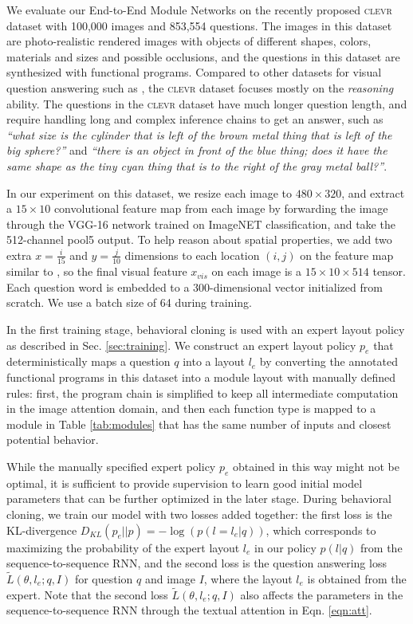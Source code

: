 \documentclass[10pt,twocolumn,letterpaper]{article}
\newcommand{\clevr}{\textsc{clevr}\xspace}
\begin{document}
We evaluate our End-to-End Module Networks on the recently proposed \clevr dataset \cite{johnson2017clevr} with 100,000 images and 853,554 questions. The images in this dataset are photo-realistic rendered images with objects of different shapes, colors, materials and sizes and possible occlusions, and the questions in this dataset are synthesized with functional programs. Compared to other datasets for visual question answering such as \cite{antol15iccv}, the \textsc{clevr} dataset focuses mostly on the \textit{reasoning} ability. The questions in the \clevr dataset have much longer question length, and require handling long and complex inference chains to get an answer, such as \textit{``what size is the cylinder that is left of the brown metal thing that is left of the big sphere?''} and \textit{``there is an object in front of the blue thing; does it have the same shape as the tiny cyan thing that is to the right of the gray metal ball?''}.

In our experiment on this dataset, we resize each image to $480 \times 320$, and extract a $15 \times 10$ convolutional feature map from each image by forwarding the image through the VGG-16 network \cite{simonyan2015very} trained on ImageNET classification, and take the 512-channel pool5 output. To help reason about spatial properties, we add two extra $x = \frac{i}{15}$ and $y = \frac{j}{10}$ dimensions to each location $(i,j)$ on the feature map similar to \cite{hu2016segmentation}, so the final visual feature $x_{vis}$ on each image is a $15 \times 10 \times 514$ tensor. Each question word is embedded to a 300-dimensional vector initialized from scratch. We use a batch size of 64 during training.

In the first training stage, behavioral cloning is used with an expert layout policy as described in Sec. \ref{sec:training}. We construct an expert layout policy $p_e$ that deterministically maps a question $q$ into a layout $l_e$ by converting the annotated functional programs in this dataset into a module layout with manually defined rules: first, the program chain is simplified to keep all intermediate computation in  the image attention domain, and then each function type is mapped to a module in Table \ref{tab:modules} that has the same number of inputs and closest potential behavior.

While the manually specified expert policy $p_e$ obtained in this way might not be optimal, it is sufficient to provide supervision to learn good initial model parameters that can be further optimized in the later stage. During behavioral cloning, we train our model with two losses added together: the first loss is the KL-divergence $D_{KL}(p_e || p) = -\log( p(l = l_e | q) )$, which corresponds to maximizing the probability of the expert layout $l_e$ in our policy $p(l | q)$ from the sequence-to-sequence RNN, and the second loss is the question answering loss $\tilde{L}(\theta, l_e; q, I)$ for question $q$ and image $I$, where the layout $l_e$ is obtained from the expert. Note that the second loss $\tilde{L}(\theta, l_e; q, I)$ also affects the parameters in the sequence-to-sequence RNN through the textual attention in Eqn. \ref{eqn:att}.
\end{document}
